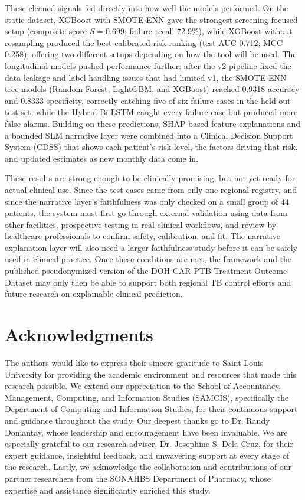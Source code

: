 \documentclass[12pt]{article}
\begin{document}
These cleaned signals fed directly into how well the models performed. On the static dataset, XGBoost with SMOTE-ENN gave the strongest screening-focused setup (composite score $S = 0.699$; failure recall 72.9\%), while XGBoost without resampling produced the best-calibrated risk ranking (test AUC 0.712; MCC 0.258), offering two different setups depending on how the tool will be used. The longitudinal models pushed performance further: after the v2 pipeline fixed the data leakage and label-handling issues that had limited v1, the SMOTE-ENN tree models (Random Forest, LightGBM, and XGBoost) reached 0.9318 accuracy and 0.8333 specificity, correctly catching five of six failure cases in the held-out test set, while the Hybrid Bi-LSTM caught every failure case but produced more false alarms. Building on these predictions, SHAP-based feature explanations and a bounded SLM narrative layer were combined into a Clinical Decision Support System (CDSS) that shows each patient's risk level, the factors driving that risk, and updated estimates as new monthly data come in.

These results are strong enough to be clinically promising, but not yet ready for actual clinical use. Since the test cases came from only one regional registry, and since the narrative layer's faithfulness was only checked on a small group of 44 patients, the system must first go through external validation using data from other facilities, prospective testing in real clinical workflows, and review by healthcare professionals to confirm safety, calibration, and fit. The narrative explanation layer will also need a larger faithfulness study before it can be safely used in clinical practice. Once these conditions are met, the framework and the published pseudonymized version of the DOH-CAR PTB Treatment Outcome Dataset may only then be able to support both regional TB control efforts and future research on explainable clinical prediction.


\section{Acknowledgments}

The authors would like to express their sincere gratitude to Saint Louis University for providing the academic environment and resources that made this research possible. We extend our appreciation to the School of Accountancy, Management, Computing, and Information Studies (SAMCIS), specifically the Department of Computing and Information Studies, for their continuous support and guidance throughout the study. Our deepest thanks go to Dr. Randy Domantay, whose leadership and encouragement have been invaluable. We are especially grateful to our research adviser, Dr. Josephine S. Dela Cruz, for their expert guidance, insightful feedback, and unwavering support at every stage of the research. Lastly, we acknowledge the collaboration and contributions of our partner researchers from the SONAHBS Department of Pharmacy, whose expertise and assistance significantly enriched this study.
\end{document}
